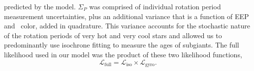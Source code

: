 predicted by the model.
$\Sigma_P$ was comprised of individual rotation period measurement
uncertainties, plus an additional variance that is a function of EEP and
\gcolor\
color, added in quadrature.
This variance accounts for the stochastic nature of the rotation periods of
very hot and very cool stars and allowed us to predominantly use isochrone
fitting to measure the ages of subgiants.
The full likelihood used in our model was the product of these two likelihood
functions,
\begin{equation}
    \mathcal{L}_{\mathrm{full}} = \mathcal{L}_{\mathrm{iso}} \times
    \mathcal{L}_{\mathrm{gyro}}.
\end{equation}



